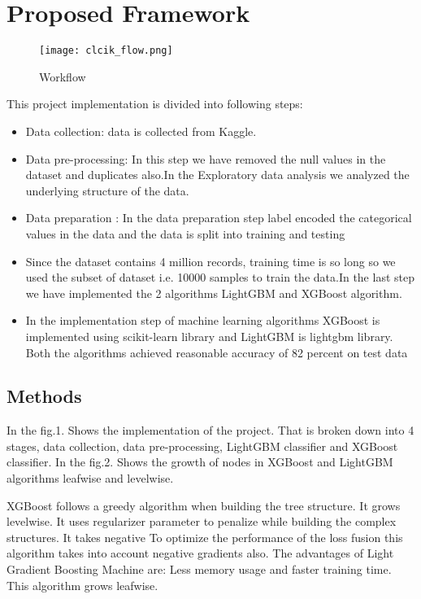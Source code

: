 \documentclass[conference]{IEEEtran}
\begin{document}
\section{Proposed Framework}
 \begin{figure}[!h]
     \centering
     \texttt{[image: clcik\_flow.png]}
    \caption{Workflow}
    \label{fig:8}
 \end{figure}
This project implementation is divided into following steps:
\begin{itemize}
    \item Data collection: data is collected from Kaggle.
    \item Data pre-processing: In this step we have removed the null values in the dataset and duplicates also.In the Exploratory data analysis we analyzed the underlying structure of the data.
    \item Data preparation : In the data preparation step label encoded the categorical values in the data and the data is split into training and testing
    \item Since the dataset contains 4 million records, training time is so long so we used the subset of dataset i.e. 10000 samples to train the data.In the last step we have implemented the 2 algorithms LightGBM and XGBoost algorithm.
    \item In the implementation step of machine learning algorithms XGBoost is implemented using scikit-learn library and LightGBM is lightgbm library.
Both the algorithms achieved reasonable accuracy of 82 percent on test data

\end{itemize}

\subsection{Methods}
In the fig.1.  Shows the implementation of the project. That is broken down into 4 stages, data collection, data pre-processing, LightGBM classifier and XGBoost classifier.
In the fig.2. Shows the growth of nodes in XGBoost and LightGBM algorithms leafwise and levelwise.

XGBoost follows a greedy algorithm when building the tree structure. It grows levelwise.
It uses regularizer parameter to penalize while building the complex structures. It takes negative To optimize the performance of the loss fusion this algorithm takes into account negative gradients also.
The advantages of Light Gradient Boosting Machine are:
Less memory usage and faster training time. This algorithm grows leafwise.
\end{document}
